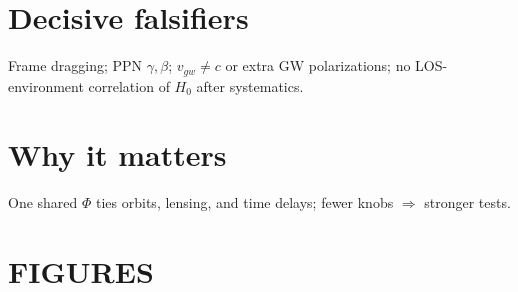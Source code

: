 \documentclass[
]{article}
\begin{document}
\section{Decisive falsifiers}\label{decisive-falsifiers}

Frame dragging; PPN \(\gamma,\beta\); \(v_{gw} \neq c\) or extra GW
polarizations; no LOS-environment correlation of \(H_{0}\) after
systematics.

\section{Why it matters}\label{why-it-matters}

One shared \(\Phi\) ties orbits, lensing, and time delays; fewer knobs
\(\Rightarrow\) stronger tests.

\section{FIGURES}\label{figures}
\end{document}
